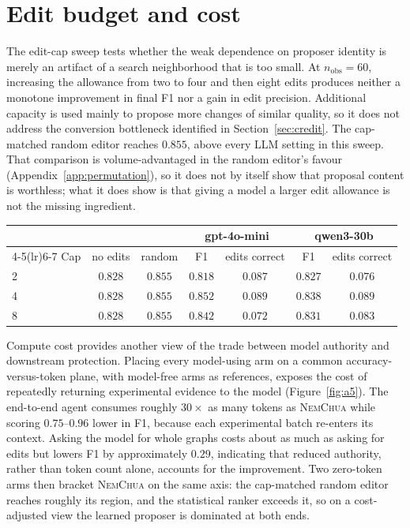 \documentclass{article}
\newcommand{\nem}{\textsc{NemChua}}
\begin{document}
\section{Edit budget and cost}
\label{app:budget}

The edit-cap sweep tests whether the weak dependence on proposer identity is merely an artifact of a
search neighborhood that is too small. At $n_{\mathrm{obs}}{=}60$, increasing the allowance from
two to four and then eight edits produces neither a monotone improvement in final F1 nor a gain in
edit precision. Additional capacity is used mainly to propose more changes of similar quality, so it
does not address the conversion bottleneck identified in Section~\ref{sec:credit}. The cap-matched
random editor reaches $0.855$, above every LLM setting in this sweep. That comparison is
volume-advantaged in the random editor's favour (Appendix~\ref{app:permutation}), so it does not by
itself show that proposal content is worthless; what it does show is that giving a model a larger
edit allowance is not the missing ingredient.

\begin{table}[h]
\centering
\small
\setlength{\tabcolsep}{6pt}
\begin{tabular}{lcccccc}
\toprule
& & & \multicolumn{2}{c}{gpt-4o-mini} & \multicolumn{2}{c}{qwen3-30b} \\
\cmidrule(lr){4-5}\cmidrule(lr){6-7}
Cap & no edits & random & F1 & edits correct & F1 & edits correct \\
\midrule
2 & $0.828$ & $0.855$ & $0.818$ & $0.087$ & $0.827$ & $0.076$ \\
4 & $0.828$ & $0.855$ & $0.852$ & $0.089$ & $0.838$ & $0.089$ \\
8 & $0.828$ & $0.855$ & $0.842$ & $0.072$ & $0.831$ & $0.083$ \\
\bottomrule
\end{tabular}
\end{table}

Compute cost provides another view of the trade between model authority and downstream protection.
Placing every model-using arm on a common accuracy-versus-token plane, with model-free arms as
references, exposes the cost of repeatedly returning experimental evidence to the model
(Figure~\ref{fig:a5}). The end-to-end agent consumes roughly $30\times$ as many tokens
as \nem{} while scoring $0.75$--$0.96$ lower in F1, because each experimental batch re-enters its
context. Asking the model for whole graphs costs about as much as asking for edits but lowers F1 by
approximately $0.29$, indicating that reduced authority, rather than token count alone, accounts for
the improvement. Two zero-token arms then bracket \nem{} on the same axis: the cap-matched random
editor reaches roughly its region, and the statistical ranker exceeds it, so on a cost-adjusted view
the learned proposer is dominated at both ends.
\end{document}
